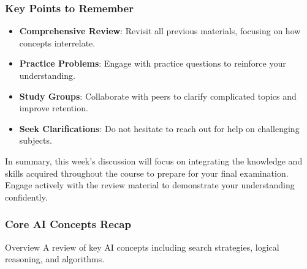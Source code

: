 \documentclass[aspectratio=169]{beamer}
\begin{document}
\begin{frame}[fragile]
    \frametitle{Key Points to Remember}
    \begin{itemize}
        \item \textbf{Comprehensive Review}: Revisit all previous materials, focusing on how concepts interrelate.
        \item \textbf{Practice Problems}: Engage with practice questions to reinforce your understanding.
        \item \textbf{Study Groups}: Collaborate with peers to clarify complicated topics and improve retention.
        \item \textbf{Seek Clarifications}: Do not hesitate to reach out for help on challenging subjects.
    \end{itemize}

    In summary, this week’s discussion will focus on integrating the knowledge and skills acquired throughout the course to prepare for your final examination. Engage actively with the review material to demonstrate your understanding confidently.
\end{frame}

\begin{frame}[fragile]
    \frametitle{Core AI Concepts Recap}
    \begin{block}{Overview}
        A review of key AI concepts including search strategies, logical reasoning, and algorithms.
    \end{block}
\end{frame}
\end{document}
